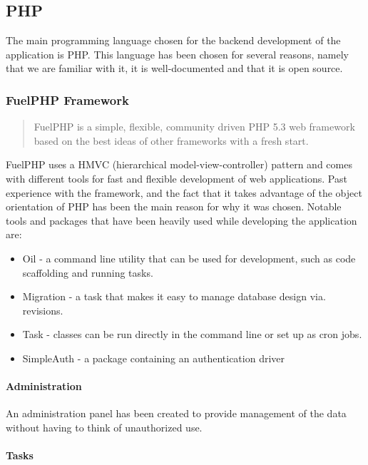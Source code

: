 \subsection{PHP}

The main programming language chosen for the backend development of the application is PHP. This language has been chosen for several reasons, namely that we are familiar with it, it is well-documented and that it is open source.

\subsubsection{FuelPHP Framework}

\begin{quote}
FuelPHP is a simple, flexible, community driven PHP 5.3 web framework based on the best ideas of other frameworks with a fresh start\cite{FuelPHP}.
\end{quote}


FuelPHP uses a HMVC (hierarchical model-view-controller) pattern and comes with different tools for fast and flexible development of web applications. Past experience with the framework, and the fact that it takes advantage of the object orientation of PHP has been the main reason for why it was chosen. Notable tools and packages that have been heavily used while developing the application are:

\begin{itemize}
\item Oil - a command line utility that can be used for development, such as code scaffolding and running tasks. 
\item Migration - a task that makes it easy to manage database design via. revisions.
\item Task - classes can be run directly in the command line or set up as cron jobs.
\item SimpleAuth - a package containing an authentication driver
\end{itemize}

\paragraph{Administration}

An administration panel has been created to provide management of the data without having to think of unauthorized use. 

\paragraph{Tasks}

